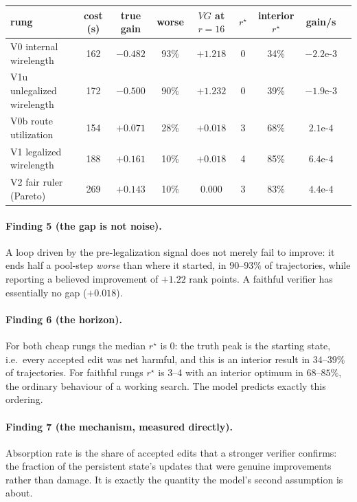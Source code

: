\documentclass{article}
\begin{document}
\begin{center}
\begin{tabular}{lcccccccc}
\toprule
rung & cost (s) & true gain & worse & $VG$ at $r{=}16$ & $r^\star$ & interior $r^\star$ & gain/s \\
\midrule
V0 internal wirelength & 162 & $-0.482$ & $93\%$ & $+1.218$ & 0 & 34\% & $-2.2\text{e-}3$ \\
V1u unlegalized wirelength & 172 & $-0.500$ & $90\%$ & $+1.232$ & 0 & 39\% & $-1.9\text{e-}3$ \\
V0b route utilization & 154 & $+0.071$ & 28\% & $+0.018$ & 3 & 68\% & $2.1\text{e-}4$ \\
V1 legalized wirelength & 188 & $+0.161$ & 10\% & $+0.018$ & 4 & 85\% & $6.4\text{e-}4$ \\
V2 fair ruler (Pareto) & 269 & $+0.143$ & 10\% & $0.000$ & 3 & 83\% & $4.4\text{e-}4$ \\
\bottomrule
\end{tabular}
\end{center}

\paragraph{Finding 5 (the gap is not noise).} A loop driven by the pre-legalization
signal does not merely fail to improve: it ends half a pool-step \emph{worse} than
where it started, in $90$--$93\%$ of trajectories, while reporting a believed
improvement of $+1.22$ rank points. A faithful verifier has essentially no gap
($+0.018$).

\paragraph{Finding 6 (the horizon).} For both cheap rungs the median $r^\star$ is $0$:
the truth peak is the starting state, i.e.\ every accepted edit was net harmful, and
this is an interior result in $34$--$39\%$ of trajectories. For faithful rungs
$r^\star$ is 3--4 with an interior optimum in $68$--$85\%$, the ordinary behaviour of
a working search. The model predicts exactly this ordering.

\paragraph{Finding 7 (the mechanism, measured directly).} Absorption rate is the
share of accepted edits that a stronger verifier confirms: the fraction of the
persistent state's updates that were genuine improvements rather than damage. It is
exactly the quantity the model's second assumption is about.
\end{document}
